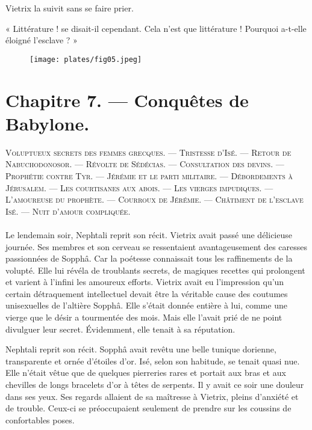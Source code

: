 \documentclass[a4paper, 11pt, oneside, polutonikogreek, french]{article}
\begin{document}
Vietrix la suivit sans se faire prier.

« Littérature ! se disait-il cependant. Cela n'est que littérature ! Pourquoi a-t-elle éloigné l'esclave ? »
\clearpage
\begin{figure}[H]
\centering
\texttt{[image: plates/fig05.jpeg]}
\end{figure}
\section{Chapitre 7. --- Conquêtes de Babylone.}
\begin{center}
\scshape
\small
Voluptueux secrets des femmes grecques. --- Tristesse d'Isé. --- Retour de Nabuchodonosor. --- Révolte de Sédécias. --- Consultation des devins. --- Prophétie contre Tyr. --- Jérémie et le parti militaire. --- Débordements à Jérusalem. --- Les courtisanes aux abois. --- Les vierges impudiques. --- L'amoureuse du prophète. --- Courroux de Jérémie. --- Châtiment de l'esclave Isé. --- Nuit d'amour compliquée.
\end{center}
\paragraph{}
Le lendemain soir, Nephtali reprit son récit. Vietrix avait passé une délicieuse journée. Ses membres et son cerveau se ressentaient avantageusement des caresses passionnées de Sopphâ. Car la poétesse connaissait tous les raffinements de la volupté. Elle lui révéla de troublants secrets, de magiques recettes qui prolongent et varient à l'infini les amoureux efforts. Vietrix avait eu l'impression qu'un certain détraquement intellectuel devait être la véritable cause des coutumes unisexuelles de l'altière Sopphâ. Elle s'était donnée entière à lui, comme une vierge que le désir a tourmentée des mois. Mais elle l'avait prié de ne point divulguer leur secret. Évidemment, elle tenait à sa réputation.

\bigskip
\centerline{\EightStarTaper}
\centerline{\EightStarTaper\EightStarTaper}
\bigskip

Nephtali reprit son récit. Sopphâ avait revêtu une belle tunique dorienne, transparente et ornée d'étoiles d'or. Isé, selon son habitude, se tenait quasi nue. Elle n'était vêtue que de quelques pierreries rares et portait aux bras et aux chevilles de longs bracelets d'or à têtes de serpents. Il y avait ce soir une douleur dans ses yeux. Ses regards allaient de sa maîtresse à Vietrix, pleins d'anxiété et de trouble. Ceux-ci se préoccupaient seulement de prendre sur les coussins de confortables poses.
\end{document}
